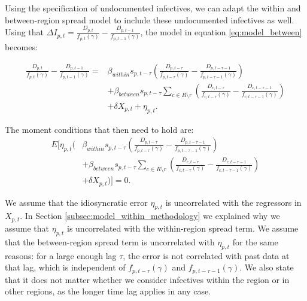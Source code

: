 \documentclass[12pt]{article}
\begin{document}
	Using the specification of undocumented infectives, we can adapt the within and between-region spread model to include these undocumented infectives as well. Using that $\Delta I_{p,t} = \frac{D_{p,t}}{f_{p,t}(\gamma)} - \frac{D_{p,t-1}}{f_{p,t-1}(\gamma)}$, the model in equation \eqref{eq:model_between} becomes:
	
	    \begin{equation} \label{eq:model_between_undocumented}
            \begin{split}
        		\frac{D_{p,t}}{f_{p,t}(\gamma)} - \frac{D_{p,t-1}}{f_{p,t-1}(\gamma)} = &\beta_{within}s_{p,t-\tau}\left(\frac{D_{p,t-\tau}}{f_{p,t-\tau}(\gamma)} - \frac{D_{p,t-\tau-1}}{f_{p,t-\tau-1}(\gamma)}\right) \\
    		    &+ \beta_{between}s_{p,t-\tau} \sum_{c \in R \setminus r} \left(\frac{D_{c,t-\tau}}{f_{c,t-\tau}(\gamma)} - \frac{D_{c,t-\tau-1}}{f_{c,t-\tau-1}(\gamma)} \right) \\
    		    &+ \delta X_{p,t} + \eta_{p,t}.
    		\end{split}
        \end{equation}
	    
	\noindent The moment conditions that then need to hold are:
	    \begin{equation} \label{eq:model_between_undocumented_moments}
            \begin{split}
    	        E\Bigg[ \eta_{p,t}\Bigg( &\beta_{within}s_{p,t-\tau}\left(\frac{D_{p,t-\tau}}{f_{p,t-\tau}(\gamma)} - \frac{D_{p,t-\tau-1}}{f_{p,t-\tau-1}(\gamma)}\right) \\
    	        &+ \beta_{between}s_{p,t-\tau} \sum_{c \in R \setminus r} \left(\frac{D_{c,t-\tau}}{f_{c,t-\tau}(\gamma)} - \frac{D_{c,t-\tau-1}}{f_{c,t-\tau-1}(\gamma)} \right) \\
    	        &+ \delta X_{p,t} \Bigg) \Bigg] = 0.
	        \end{split}
        \end{equation}
	
	We assume that the idiosyncratic error $\eta_{p,t}$ is uncorrelated with the regressors in $X_{p,t}$. In Section \ref{subsec:model_within_methodology} we explained why we assume that $\eta_{p,t}$ is uncorrelated with the within-region spread term. We assume that the between-region spread term is uncorrelated with $\eta_{p,t}$ for the same reasons: for a large enough lag $\tau$, the error is not correlated with past data at that lag, which is independent of $f_{p,t-\tau}(\gamma)$ and $f_{p,t-\tau-1}(\gamma)$. We also state that it does not matter whether we consider infectives within the region or in other regions, as the longer time lag applies in any case.
	
\end{document}
